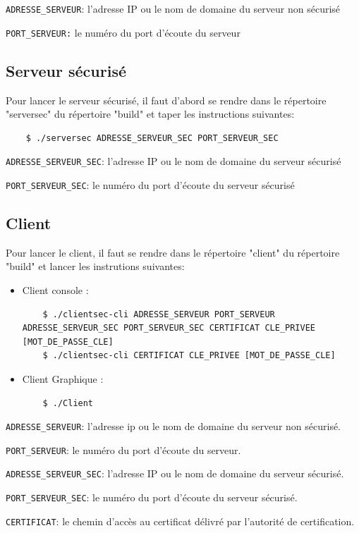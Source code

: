 \documentclass[a4paper,11pt,french]{book}
\begin{document}
\verb+ADRESSE_SERVEUR+: l'adresse IP ou le nom de domaine du serveur non sécurisé

\verb+PORT_SERVEUR:+ le numéro du port d'écoute du serveur

\subsection{Serveur sécurisé}
Pour lancer le serveur sécurisé, il faut d'abord se rendre dans le répertoire "serversec" du répertoire "build" et taper les instructions suivantes:
\begin{verbatim}
    $ ./serversec ADRESSE_SERVEUR_SEC PORT_SERVEUR_SEC
\end{verbatim}

\verb+ADRESSE_SERVEUR_SEC+: l'adresse IP ou le nom de domaine du serveur sécurisé

\verb+PORT_SERVEUR_SEC+: le numéro du port d'écoute du serveur sécurisé

\subsection{Client}
Pour lancer le client, il faut se rendre dans le répertoire "client" du répertoire "build" et lancer les instrutions suivantes:
\begin{itemize}
\item Client console : 
\begin{verbatim}
    $ ./clientsec-cli ADRESSE_SERVEUR PORT_SERVEUR ADRESSE_SERVEUR_SEC PORT_SERVEUR_SEC CERTIFICAT CLE_PRIVEE [MOT_DE_PASSE_CLE]
    $ ./clientsec-cli CERTIFICAT CLE_PRIVEE [MOT_DE_PASSE_CLE]
\end{verbatim}
\item Client Graphique :
\begin{verbatim}
    $ ./Client
\end{verbatim}
\end{itemize}

\verb+ADRESSE_SERVEUR+: l'adresse ip ou le nom de domaine du serveur non sécurisé.

\verb+PORT_SERVEUR+: le numéro du port d'écoute du serveur.

\verb+ADRESSE_SERVEUR_SEC+: l'adresse IP ou le nom de domaine du serveur sécurisé.

\verb+PORT_SERVEUR_SEC+: le numéro du port d'écoute du serveur sécurisé.

\verb+CERTIFICAT+: le chemin d'accès au certificat délivré par l'autorité de certification.
\end{document}
